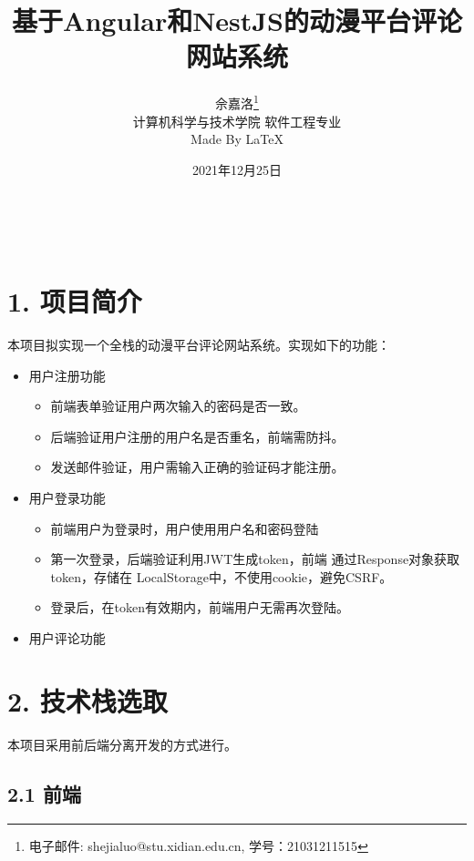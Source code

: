 \documentclass[a4paper,12pt, centering]{ctexart}
\title{基于Angular和NestJS的动漫平台评论网站系统}
\author{佘嘉洛\footnote{电子邮件: shejialuo@stu.xidian.edu.cn,
     学号：21031211515}\\[2ex] 计算机科学与技术学院 软件工程专业
     \\[2ex] Made By \LaTeX}
\date{2021年12月25日}
\begin{document}
  \
  \vspace{6cm}
  \begingroup
  \let\newpage\relax
  \maketitle
  \thispagestyle{empty}
  \endgroup

  \newpage

  \setcounter{page}{1}

  \section*{1. 项目简介}

  本项目拟实现一个全栈的动漫平台评论网站系统。实现如下的功能：

  \begin{itemize}
    \item 用户注册功能
          \begin{itemize}
            \item 前端表单验证用户两次输入的密码是否一致。
            \item 后端验证用户注册的用户名是否重名，前端需防抖。
            \item 发送邮件验证，用户需输入正确的验证码才能注册。
          \end{itemize}
    \item 用户登录功能
          \begin{itemize}
            \item 前端用户为登录时，用户使用用户名和密码登陆
            \item 第一次登录，后端验证利用JWT生成token，前端
                  通过Response对象获取token，存储在
                  LocalStorage中，不使用cookie，避免CSRF。
            \item 登录后，在token有效期内，前端用户无需再次登陆。
          \end{itemize}
    \item 用户评论功能
  \end{itemize}

  \section*{2. 技术栈选取}

  本项目采用前后端分离开发的方式进行。

  \subsection*{2.1 前端}
\end{document}
